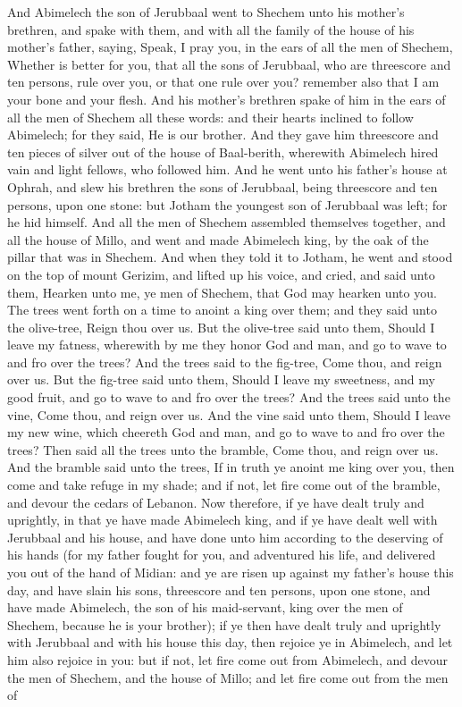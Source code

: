 And Abimelech the son of Jerubbaal went to Shechem unto his mother’s brethren, and spake with them, and with all the family of the house of his mother’s father, saying, Speak, I pray you, in the ears of all the men of Shechem, Whether is better for you, that all the sons of Jerubbaal, who are threescore and ten persons, rule over you, or that one rule over you? remember also that I am your bone and your flesh. And his mother’s brethren spake of him in the ears of all the men of Shechem all these words: and their hearts inclined to follow Abimelech; for they said, He is our brother. And they gave him threescore and ten pieces of silver out of the house of Baal-berith, wherewith Abimelech hired vain and light fellows, who followed him. And he went unto his father’s house at Ophrah, and slew his brethren the sons of Jerubbaal, being threescore and ten persons, upon one stone: but Jotham the youngest son of Jerubbaal was left; for he hid himself. And all the men of Shechem assembled themselves together, and all the house of Millo, and went and made Abimelech king, by the oak of the pillar that was in Shechem.  And when they told it to Jotham, he went and stood on the top of mount Gerizim, and lifted up his voice, and cried, and said unto them, Hearken unto me, ye men of Shechem, that God may hearken unto you. The trees went forth on a time to anoint a king over them; and they said unto the olive-tree, Reign thou over us. But the olive-tree said unto them, Should I leave my fatness, wherewith by me they honor God and man, and go to wave to and fro over the trees? And the trees said to the fig-tree, Come thou, and reign over us. But the fig-tree said unto them, Should I leave my sweetness, and my good fruit, and go to wave to and fro over the trees? And the trees said unto the vine, Come thou, and reign over us. And the vine said unto them, Should I leave my new wine, which cheereth God and man, and go to wave to and fro over the trees? Then said all the trees unto the bramble, Come thou, and reign over us. And the bramble said unto the trees, If in truth ye anoint me king over you, then come and take refuge in my shade; and if not, let fire come out of the bramble, and devour the cedars of Lebanon. Now therefore, if ye have dealt truly and uprightly, in that ye have made Abimelech king, and if ye have dealt well with Jerubbaal and his house, and have done unto him according to the deserving of his hands (for my father fought for you, and adventured his life, and delivered you out of the hand of Midian: and ye are risen up against my father’s house this day, and have slain his sons, threescore and ten persons, upon one stone, and have made Abimelech, the son of his maid-servant, king over the men of Shechem, because he is your brother); if ye then have dealt truly and uprightly with Jerubbaal and with his house this day, then rejoice ye in Abimelech, and let him also rejoice in you: but if not, let fire come out from Abimelech, and devour the men of Shechem, and the house of Millo; and let fire come out from the men of 